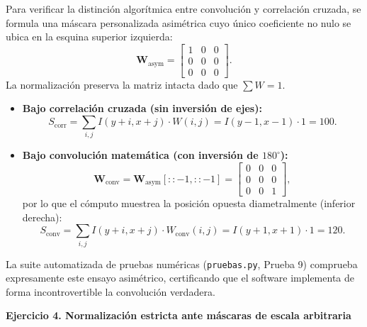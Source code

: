 \documentclass[11pt]{article}
\begin{document}
Para verificar la distinción algorítmica entre convolución y correlación cruzada, se formula una máscara personalizada asimétrica cuyo único coeficiente no nulo se ubica en la esquina superior izquierda:
\begin{equation}
\mathbf{W}_{\text{asym}} = \begin{bmatrix} 1 & 0 & 0 \\ 0 & 0 & 0 \\ 0 & 0 & 0 \end{bmatrix}.
\end{equation}
La normalización preserva la matriz intacta dado que $\sum W = 1$.
\begin{itemize}[itemsep=0.2em]
\item \textbf{Bajo correlación cruzada (sin inversión de ejes):}
\begin{equation}
S_{\text{corr}} = \sum_{i, j} I(y+i, x+j) \cdot W(i, j) = I(y-1, x-1) \cdot 1 = 100.
\end{equation}
\item \textbf{Bajo convolución matemática (con inversión de $180^\circ$):}
\begin{equation}
\mathbf{W}_{\text{conv}} = \mathbf{W}_{\text{asym}}[::-1, ::-1] = \begin{bmatrix} 0 & 0 & 0 \\ 0 & 0 & 0 \\ 0 & 0 & 1 \end{bmatrix},
\end{equation}
por lo que el cómputo muestrea la posición opuesta diametralmente (inferior derecha):
\begin{equation}
S_{\text{conv}} = \sum_{i, j} I(y+i, x+j) \cdot W_{\text{conv}}(i, j) = I(y+1, x+1) \cdot 1 = 120.
\end{equation}
\end{itemize}
La suite automatizada de pruebas numéricas (\texttt{pruebas.py}, Prueba 9) comprueba expresamente este ensayo asimétrico, certificando que el software implementa de forma incontrovertible la convolución verdadera.

\textbf{Ejercicio 4. Normalización estricta ante máscaras de escala arbitraria}
\end{document}
